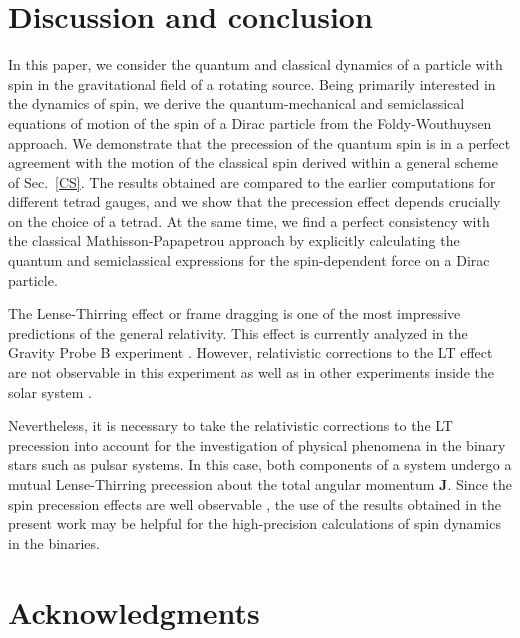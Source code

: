 \documentclass[preprint,showpacs,preprintnumbers,amsmath,amssymb]{revtex4}
\begin{document}
\section{Discussion and conclusion}\label{discussion}

In this paper, we consider the quantum and classical dynamics of a particle
with spin in the gravitational field of a rotating source. Being primarily
interested in the dynamics of spin, we derive the quantum-mechanical and
semiclassical equations of motion of the spin of a Dirac particle from the
Foldy-Wouthuysen approach. We demonstrate that the precession of the quantum
spin is in a perfect agreement with the motion of the classical spin derived
within a general scheme of Sec.~\ref{CS}. The results obtained are compared
to the earlier computations for different tetrad gauges, and we show that the
precession effect depends crucially on the choice of a tetrad. At the same
time, we find a perfect consistency with the classical Mathisson-Papapetrou
approach by explicitly calculating the quantum and semiclassical expressions
for the spin-dependent force on a Dirac particle.

The Lense-Thirring effect or frame dragging is one of the most impressive
predictions of the general relativity. This effect is currently analyzed
in the Gravity Probe B experiment \cite{GP-B,GP-B_problems}.
However, relativistic corrections to the LT effect are not observable in
this experiment as well as in other experiments inside the solar system
\cite{solar}.

Nevertheless, it is necessary to take the relativistic corrections to the
LT precession into account for the investigation of physical phenomena in
the binary stars such as pulsar systems. In this case, both components of a
system undergo a mutual Lense-Thirring precession about the total angular
momentum $\bm J$. Since the spin precession effects are well observable
\cite{radiopulsars,binaries,relpulsar}, the use of the results obtained
in the present work may be helpful for the high-precision calculations of
spin dynamics in the binaries.

\section*{Acknowledgments}
\end{document}
